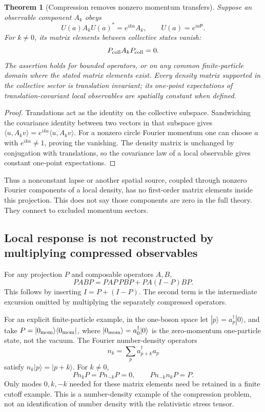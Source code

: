 \documentclass[11pt]{article}
\newtheorem{theorem}{Theorem}[section]
\theoremstyle{remark}
\begin{document}
\begin{theorem}[Compression removes nonzero momentum transfers]
\label{thm:v20v68-transfer}
Suppose an observable component \(A_k\) obeys
\[
 U(a)A_kU(a)^*=e^{ika}A_k,\qquad U(a)=e^{ia\mathsf P}.
\]
For \(k\ne0\), its matrix elements between collective
states vanish:
\[
 P_{\rm coll}A_kP_{\rm coll}=0 .
\]
The assertion holds for bounded operators, or on any
common finite-particle domain where the stated matrix
elements exist.  Every density matrix supported in
the collective sector is translation invariant; its
one-point expectations of translation-covariant local
observables are spatially constant when defined.
\end{theorem}
\begin{proof}
Translations act as the identity on the collective
subspace.  Sandwiching the covariance identity between
two vectors in that subspace gives
\(\langle u,A_kv\rangle=e^{ika}\langle u,A_kv\rangle\).
For a nonzero circle Fourier momentum one can choose
\(a\) with \(e^{ika}\ne1\), proving the vanishing.
The density matrix is unchanged by conjugation with
translations, so the covariance law of a local
observable gives constant one-point expectations.
\end{proof}

Thus a nonconstant lapse or another spatial source,
coupled through nonzero Fourier components of a local
density, has no first-order matrix elements inside
this projection.  This does not say those components
are zero in the full theory.  They connect to excluded
momentum sectors.

\subsection{Local response is not reconstructed by multiplying compressed observables}

For any projection \(P\) and composable operators \(A,B\),
\[
 PABP=PAP\,PBP+PA(I-P)BP .
\]
This follows by inserting \(I=P+(I-P)\).
The second term is the intermediate excursion omitted
by multiplying the separately compressed operators.

For an explicit finite-particle example, in the
one-boson space let \(|p\rangle=a_p^\dagger|0\rangle\),
and take \(P=|0_{\rm mom}\rangle\langle0_{\rm mom}|\),
where \(|0_{\rm mom}\rangle=a_0^\dagger|0\rangle\)
is the zero-momentum one-particle state, not the vacuum.
The Fourier number-density operators
\[
 n_k=\sum_p a_{p+k}^\dagger a_p
\]
satisfy \(n_k|p\rangle=|p+k\rangle\).  For \(k\ne0\),
\[
 Pn_kP=Pn_{-k}P=0,\qquad Pn_{-k}n_kP=P .
\]
Only modes \(0,k,-k\) needed for these matrix elements
need be retained in a finite cutoff example.
This is a number-density example of the compression
problem, not an identification of number density
with the relativistic stress tensor.
\end{document}
